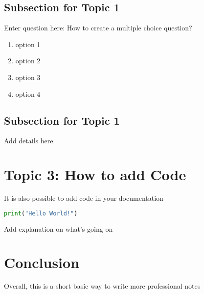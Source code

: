 \documentclass{article}
\begin{document}
\subsection{Subsection for Topic 1}
\begin{question}
Enter question here: How to create a multiple choice question?

    \begin{enumerate}[{a}]
        \item option 1
        \item option 2
        \item option 3
        \item option 4
    \end{enumerate}
\end{question}

\subsection{Subsection for Topic 1}
Add details here


\section{Topic 3: How to add Code}
It is also possible to add code in your documentation
\begin{file}[hello.py]

\begin{lstlisting}[language=Python]
print("Hello World!")
\end{lstlisting}
\end{file}
Add explanation on what's going on
\section{Conclusion}
Overall, this is a short basic way to write more professional notes
\end{document}
